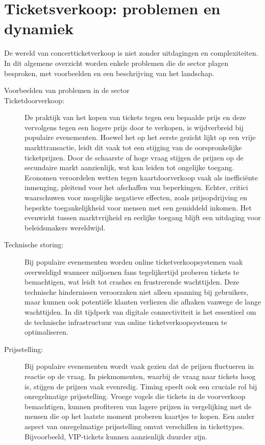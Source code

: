 \section{Ticketsverkoop: problemen en dynamiek}

De wereld van concertticketverkoop is niet zonder uitdagingen en complexiteiten. In dit algemene overzicht worden enkele problemen die de sector plagen besproken, met voorbeelden en een beschrijving van het landschap. \newline 

\begin{description}
    \item[Voorbeelden van problemen in de sector]\newline
    \item[Ticketdoorverkoop:] De praktijk van het kopen van tickets tegen een bepaalde prijs en deze vervolgens tegen een hogere prijs door te verkopen, is wijdverbreid bij populaire evenementen. Hoewel het op het eerste gezicht lijkt op een vrije markttransactie, leidt dit vaak tot een stijging van de oorspronkelijke ticketprijzen. Door de schaarste of hoge vraag stijgen de prijzen op de secundaire markt aanzienlijk, wat kan leiden tot ongelijke toegang. Economen veroordelen wetten tegen kaartdoorverkoop vaak als inefficiënte inmenging, pleitend voor het afschaffen van beperkingen. Echter, critici waarschuwen voor mogelijke negatieve effecten, zoals prijsopdrijving en beperkte toegankelijkheid voor mensen met een gemiddeld inkomen. Het evenwicht tussen marktvrijheid en eerlijke toegang blijft een uitdaging voor beleidsmakers wereldwijd.
    \item[Technische storing:] Bij populaire evenementen worden online ticketverkoopsystemen vaak overweldigd wanneer miljoenen fans tegelijkertijd proberen tickets te bemachtigen, wat leidt tot crashes en frustrerende wachttijden. Deze technische hindernissen veroorzaken niet alleen spanning bij gebruikers, maar kunnen ook potentiële klanten verliezen die afhaken vanwege de lange wachttijden. In dit tijdperk van digitale connectiviteit is het essentieel om de technische infrastructuur van online ticketverkoopsystemen te optimaliseren.
    \item[Prijsstelling:] Bij populaire evenementen wordt vaak gezien dat de prijzen fluctueren in reactie op de vraag. In piekmomenten, waarbij de vraag naar tickets hoog is, stijgen de prijzen vaak evenredig. Timing speelt ook een cruciale rol bij onregelmatige prijsstelling. Vroege vogels die tickets in de voorverkoop bemachtigen, kunnen profiteren van lagere prijzen in vergelijking met de mensen die op het laatste moment proberen kaartjes te kopen. Een ander aspect van onregelmatige prijsstelling omvat verschillen in tickettypes. Bijvoorbeeld, VIP-tickets kunnen aanzienlijk duurder zijn.

\end{description}
